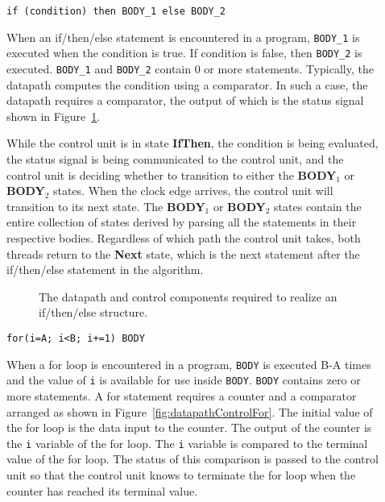 \begin{description}
    \item[]\verb^if (condition) then BODY_1 else BODY_2^

        When an if/then/else statement is encountered in a program,
        \verb^BODY_1^ is executed when the condition is true.  If condition
        is false, then \verb^BODY_2^ is executed.  \verb^BODY_1^ and \verb^BODY_2^
        contain 0 or more statements.  Typically, the datapath computes
        the condition using a comparator.  In such a case, the datapath
        requires a comparator, the output of which is
        the status signal shown in Figure~\ref{fig:datapathControlIfThen}.

        While the control unit is in state \textbf{ IfThen}, the condition
        is being evaluated, the status signal
        is being communicated to the control unit, and the control
        unit is deciding whether to transition to either the
        \textbf{ BODY}$_1$ or \textbf{ BODY}$_2$ states.  When the clock
        edge arrives, the control unit will transition to its next state.
        The \textbf{ BODY}$_1$ or \textbf{ BODY}$_2$ states contain the entire
        collection of states derived by parsing all the statements in
        their respective bodies.  Regardless of which path the control
        unit takes, both threads return to the \textbf{ Next} state, which
        is the next statement after the if/then/else statement in the algorithm.

        \begin{figure}[ht]
            \caption{The datapath and control components required to realize
            an if/then/else structure.}
            \label{fig:datapathControlIfThen}
        \end{figure}

    \item[]\verb^for(i=A; i<B; i+=1) BODY^

        When a for loop is encountered in a program, \verb^BODY^ is
        executed B-A times and the value of \verb^i^ is available
        for use inside \verb^BODY^.  \verb^BODY^ contains
        zero or more statements.  A for statement requires a counter and a
        comparator arranged as shown in Figure~\ref{fig:datapathControlFor}.  The initial
        value of the for loop is the data input to the counter.  The
        output of the counter is the \verb+i+ variable of the for loop.  The
        \verb+i+ variable is compared to the terminal value of the for loop.
        The status of this comparison is passed to the control
        unit so that the control unit knows to terminate the for loop
        when the counter has reached its terminal value.


\end{description}
